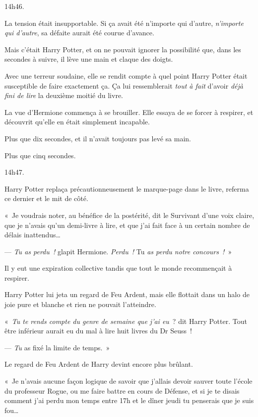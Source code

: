 14h46.

La tension était insupportable. Si ça avait été n'importe qui d'autre, \emph{n'importe qui d'autre}, sa défaite aurait été courue d'avance.

Mais c'était Harry Potter, et on ne pouvait ignorer la possibilité que, dans les secondes à suivre, il lève une main et claque des doigts.

Avec une terreur soudaine, elle se rendit compte à quel point Harry Potter était susceptible de faire exactement ça. Ça lui ressemblerait \emph{tout à fait} d'avoir \emph{déjà fini de lire} la deuxième moitié du livre.

La vue d'Hermione commença à se brouiller. Elle essaya de se forcer à respirer, et découvrit qu'elle en était simplement incapable.

Plus que dix secondes, et il n'avait toujours pas levé sa main.

Plus que cinq secondes.

14h47.

Harry Potter replaça précautionneusement le marque-page dans le livre, referma ce dernier et le mit de côté.

«~Je voudrais noter, au bénéfice de la postérité, dit le Survivant d'une voix claire, que je n'avais qu'un demi-livre à lire, et que j'ai fait face à un certain nombre de délais inattendus…

--- \emph{Tu as perdu~!} glapit Hermione. \emph{Perdu~!} Tu \emph{as perdu notre concours~!}~»

Il y eut une expiration collective tandis que tout le monde recommençait à respirer.

Harry Potter lui jeta un regard de Feu Ardent, mais elle flottait dans un halo de joie pure et blanche et rien ne pouvait l'atteindre.

«~\emph{Tu te rends compte du genre de semaine que j'ai eu}~? dit Harry Potter. Tout être inférieur aurait eu du mal à lire huit livres du Dr Seuss\footnotemark~!

--- \emph{Tu} as fixé la limite de temps.~»

Le regard de Feu Ardent de Harry devint encore plus brûlant.

«~Je n'avais aucune façon logique de savoir que j'allais devoir sauver toute l'école du professeur Rogue, ou me faire battre en cours de Défense, et si je te disais comment j'ai perdu mon temps entre 17h et le dîner jeudi tu penserais que je suis fou…

